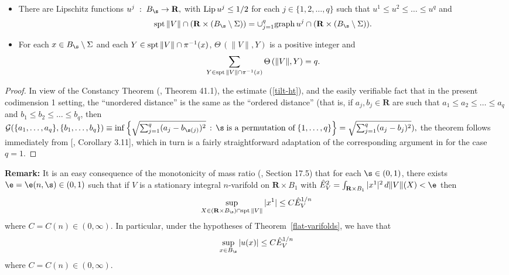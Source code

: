 \documentclass[a4paper,11pt]{amsart}
\begin{document}
\begin{theorem}
\begin{itemize}
$C = C(n , q, \s) \in (0, \infty).$ 
\item[(b)] There are Lipschitz functions $u^{j} \; : \; B_{\s} \to {\mathbf R},$ with 
${\rm Lip} \, u^{j} \leq 1/2$ for each $j \in \{1, 2, \ldots, q\}$ such that 
$u^{1} \leq u^{2} \leq \ldots \leq u^{q}$  and
$${\rm spt} \, \|V\| \cap ({\mathbf R} \times (B_{\s} \setminus \Sigma)) = \cup_{j=1}^{q} {\rm graph} \, u^{j} \cap ({\mathbf R} \times (B_{\s} \setminus \Sigma)).$$ 
\item[(c)] For each $x \in B_{\s} \setminus \Sigma$ and each $Y \in 
{\rm spt} \, \|V\| \cap \pi^{-1}(x)$, $\Theta \, (\|V\|, Y)$ is a positive integer and  
$$\sum_{Y \in {\rm spt} \, \|V\| \cap \pi^{-1}(x)} \Theta \,(\|V\|, Y) = q.$$ 
\end{itemize}
\end{theorem}


\begin{proof}  
In view of the Constancy Theorem (\cite{S1}, Theorem 41.1), the estimate (\ref{tilt-ht}), and the easily verifiable fact that in the present codimension 1 setting, the ``unordered distance'' is the same as the ``ordered distance'' (that is, if $a_{j}, b_{j} \in {\mathbf R}$ are such that $a_{1} \leq a_{2} \leq \ldots \leq a_{q}$ and $b_{1} \leq b_{2} \leq \ldots \leq b_{q}$, then 
${\mathcal G}(\{a_{1}, \ldots, a_{q}\}, \{b_{1}, \ldots, b_{q}\}) \equiv \inf\left\{\sqrt{\sum_{j=1}^{q} (a_{j} - b_{\s(j)})^{2}} \, : \, \s \; \mbox{is a permutation  of} \; \{1, \ldots, q\}\right\} = \sqrt{\sum_{j=1}^{q} (a_{j} - b_{j})^{2}}),$ the theorem follows immediately from [\cite{A}, Corollary 3.11], which in turn is a fairly straightforward adaptation of the corresponding argument in \cite{AW} for the case $q= 1.$ 
\end{proof}

\noindent
{\bf Remark:} It is an easy consequence of the monotonicity of mass ratio (\cite{S1}, Section 17.5) 
that for each $\s \in (0, 1)$, there exists $\e = \e(n, \s) \in (0, 1)$ such that if $V$ is a stationary integral $n$-varifold on ${\mathbf R} \times B_{1}$ with ${\hat E}^{2}_{V}  = \int_{{\mathbf R} \times B_{1}} |x^{1}|^{2} \, d\|V\|(X) < \e$ then 
$$\sup_{X \in \left({\mathbf R} \times B_{\s}\right) \cap {\rm spt} \, \|V\|} |x^{1}| \leq C{\hat E}_{V}^{1/n}$$
where $C = C(n) \in (0, \infty).$ In particular, under the hypotheses of Theorem~\ref{flat-varifolds}, we have that 
$$\sup_{x \in B_{\s}} |u(x)|  \leq C{\hat E}_{V}^{1/n}$$
where $C = C(n) \in (0, \infty).$


\medskip
\end{document}
